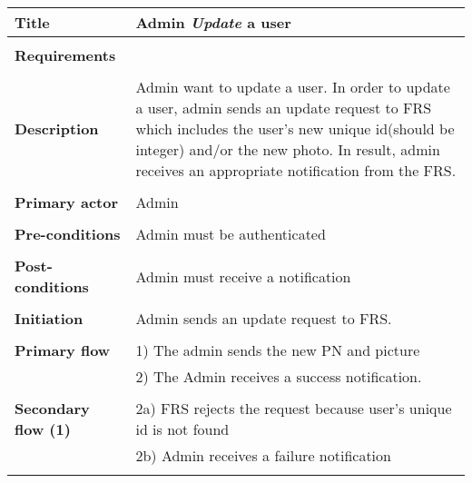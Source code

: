 \documentclass[a4paper,11pt]{article}
\begin{document}
\begin{tabular}{|p{4cm}|p{10cm}|} \hline
	\textbf{Title} &   Admin \emph{Update} a user
	
		\\ \hline \rowcolor{Gray} & \\ \hline
		\textbf{Requirements} &    
		\\ \hline \rowcolor{Gray} & \\ \hline
	
	\textbf{Description} &  Admin want to update a user. In order to update a user, admin sends an update request to FRS which includes the user's new unique id(should be integer) and/or the new photo. In result, admin receives an appropriate notification from the FRS.
	
	\\ \hline \rowcolor{Gray} & \\ \hline
	
	\textbf{Primary actor} & Admin  
	
	\\ \hline \rowcolor{Gray} & \\ \hline 
	
	\textbf{Pre-conditions} &   Admin must be authenticated
	
	\\ \hline \rowcolor{Gray} & \\ \hline
	
	\textbf{Post-conditions} &   Admin must receive a notification
	
	\\ \hline \rowcolor{Gray} & \\ \hline 
	
	\textbf{Initiation} & Admin sends an update request to FRS.
	
	\\ \hline \rowcolor{Gray} & \\ \hline 
	
	\textbf{Primary flow} & 
	1) The admin sends the new PN and picture \\&
	2) The Admin receives a success notification.
	
	\\ \hline \rowcolor{Gray} & \\ \hline 
	
	\textbf{Secondary flow (1)} & 
	2a) FRS rejects the request because user's unique id is not found \\&
	2b) Admin receives a failure notification \\& 
	

\end{tabular}
\end{document}
